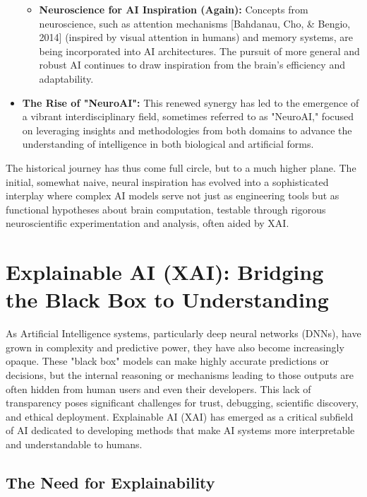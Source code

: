 \documentclass[11pt,a4paper]{article}
\begin{document}
\begin{itemize}
\begin{itemize}
            \item \textbf{Neuroscience for AI Inspiration (Again):} Concepts from neuroscience, such as attention mechanisms [Bahdanau, Cho, \& Bengio, 2014] (inspired by visual attention in humans) and memory systems, are being incorporated into AI architectures. The pursuit of more general and robust AI continues to draw inspiration from the brain's efficiency and adaptability.
        \end{itemize}
    \item \textbf{The Rise of "NeuroAI":} This renewed synergy has led to the emergence of a vibrant interdisciplinary field, sometimes referred to as "NeuroAI," focused on leveraging insights and methodologies from both domains to advance the understanding of intelligence in both biological and artificial forms.
\end{itemize}
The historical journey has thus come full circle, but to a much higher plane. The initial, somewhat naive, neural inspiration has evolved into a sophisticated interplay where complex AI models serve not just as engineering tools but as functional hypotheses about brain computation, testable through rigorous neuroscientific experimentation and analysis, often aided by XAI.

\section{Explainable AI (XAI): Bridging the Black Box to Understanding}

As Artificial Intelligence systems, particularly deep neural networks (DNNs), have grown in complexity and predictive power, they have also become increasingly opaque. These "black box" models can make highly accurate predictions or decisions, but the internal reasoning or mechanisms leading to those outputs are often hidden from human users and even their developers. This lack of transparency poses significant challenges for trust, debugging, scientific discovery, and ethical deployment. Explainable AI (XAI) has emerged as a critical subfield of AI dedicated to developing methods that make AI systems more interpretable and understandable to humans.

\subsection{The Need for Explainability}
\end{document}
